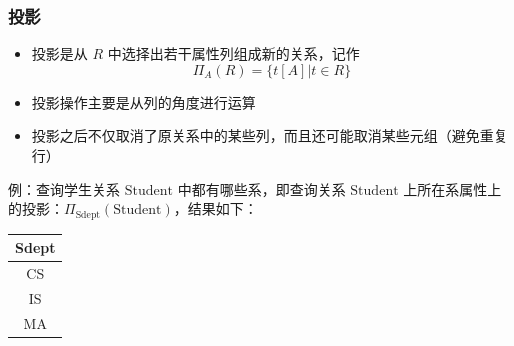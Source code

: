 \subsubsection{投影}
\begin{itemize}
    \item 投影是从 $R$ 中选择出若干属性列组成新的关系，记作
    $$\Pi_A(R) = \{t[A]| t \in R\}$$
    \item 投影操作主要是从列的角度进行运算
    \item 投影之后不仅取消了原关系中的某些列，而且还可能取消某些元组（避免重复行）
\end{itemize}

例：查询学生关系 $\mathrm{Student}$ 中都有哪些系，即查询关系 $\mathrm{Student}$ 上所在系属性上的投影：$\Pi _\mathrm{Sdept}(\mathrm{Student})$，结果如下：
\begin{table}[H]
    \centering
    \vspace{-0.5em}
    \begin{tabular}{|c|}
        \hline
        Sdept \\ \hline
        CS    \\ \hline
        IS    \\ \hline
        MA    \\ \hline
    \end{tabular}
    \vspace{-1em}
\end{table}


